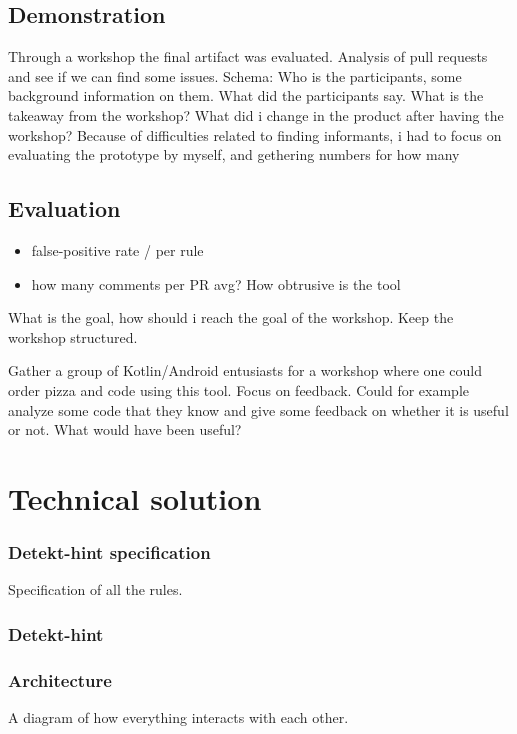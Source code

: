 \documentclass{report}
\begin{document}
\subsection*{Demonstration}
Through a workshop the final artifact was evaluated. Analysis of pull requests and see if we can find some issues.
Schema:
Who is the participants, some background information on them. What did the participants say. What is the takeaway from the workshop? What did i change in the product after having the workshop? Because of difficulties related to finding informants, i had to focus on evaluating the prototype by myself, and gethering numbers for how many 

\subsection*{Evaluation}
\begin{itemize}
    \item false-positive rate / per rule
    \item how many comments per PR avg? How obtrusive is the tool
\end{itemize}

What is the goal, how should i reach the goal of the workshop. Keep the workshop structured.


Gather a group of Kotlin/Android entusiasts for a workshop where one could order pizza and code using this tool. Focus on feedback. Could for example analyze some code that they know and give some feedback on whether it is useful or not. What would have been useful?


\section{Technical solution}
\label{technical-solution}
\subsubsection{Detekt-hint specification}
Specification of all the rules.

\subsubsection{Detekt-hint}

\subsubsection{Architecture}
A diagram of how everything interacts with each other.
\end{document}
